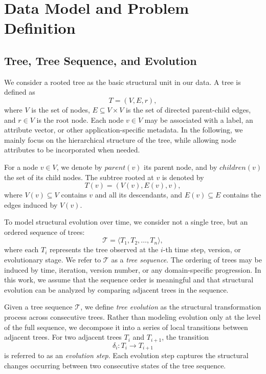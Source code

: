 \section{Data Model and Problem Definition}
\label{sec:data_model}



\subsection{Tree, Tree Sequence, and Evolution}

We consider a rooted tree as the basic structural unit in our data. A tree is defined as
\[
T = (V, E, r),
\]
where $V$ is the set of nodes, $E \subseteq V \times V$ is the set of directed parent-child edges, and $r \in V$ is the root node. Each node $v \in V$ may be associated with a label, an attribute vector, or other application-specific metadata. In the following, we mainly focus on the hierarchical structure of the tree, while allowing node attributes to be incorporated when needed.

For a node $v \in V$, we denote by $parent(v)$ its parent node, and by $children(v)$ the set of its child nodes. The subtree rooted at $v$ is denoted by
\[
T(v) = (V(v), E(v), v),
\]
where $V(v) \subseteq V$ contains $v$ and all its descendants, and $E(v) \subseteq E$ contains the edges induced by $V(v)$.

To model structural evolution over time, we consider not a single tree, but an ordered sequence of trees:
\[
\mathcal{T} = \langle T_1, T_2, \dots, T_n \rangle,
\]
where each $T_i$ represents the tree observed at the $i$-th time step, version, or evolutionary stage. We refer to $\mathcal{T}$ as a \emph{tree sequence}. The ordering of trees may be induced by time, iteration, version number, or any domain-specific progression. In this work, we assume that the sequence order is meaningful and that structural evolution can be analyzed by comparing adjacent trees in the sequence.

Given a tree sequence $\mathcal{T}$, we define \emph{tree evolution} as the structural transformation process across consecutive trees. Rather than modeling evolution only at the level of the full sequence, we decompose it into a series of local transitions between adjacent trees. For two adjacent trees $T_i$ and $T_{i+1}$, the transition
\[
\delta_i : T_i \rightarrow T_{i+1}
\]
is referred to as an \emph{evolution step}. Each evolution step captures the structural changes occurring between two consecutive states of the tree sequence.

